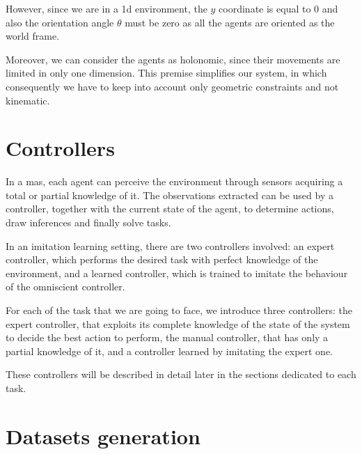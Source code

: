 However, since we are in a \gls{1d} environment, the $y$ coordinate is equal 
to $0$ and also the orientation angle $\theta$ must be zero as all the agents are 
oriented as the world frame. 

Moreover, we can consider the agents as holonomic, since their movements are 
limited in only one dimension. This premise simplifies our system, in which 
consequently we have to keep into account only geometric constraints and not
kinematic.

\section{Controllers}
\label{sec:controllers}

In a \gls{mas}, each agent can perceive the environment through sensors 
acquiring a total or partial knowledge of it. The observations extracted can be 
used by a controller, together with the current state of the agent, to determine 
actions, draw inferences and finally solve tasks. 

In an imitation learning setting, there are two controllers involved: an expert 
controller, which performs the desired task with perfect knowledge of the 
environment, and a learned controller, which is trained to imitate the behaviour 
of the omniscient controller.

For each of the task that we are going to face, we introduce three controllers: the 
expert controller, that exploits its complete knowledge of the state of the system 
to decide the best action to perform, the manual controller, that has only a partial 
knowledge of it, and a controller learned by imitating the expert one.

These controllers will be described in detail later in the sections dedicated to each 
task.

\section{Datasets generation}


